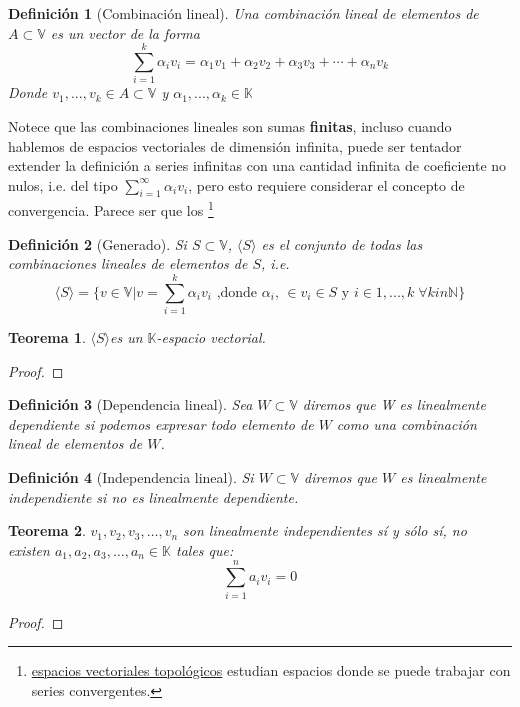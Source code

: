 \documentclass[14pt]{extarticle} %
\newtheorem{definicion}{Definición}
\newtheorem{teorema}{Teorema}
\theoremstyle{problemastyle} %
\newcommand{\kampo}{\mathbb{K}}
\newcommand{\evV}{\mathbb{V}} %
\newcommand{\bb}[1]{\mathbb{#1}}
\newcommand{\generado}[1]{\langle #1 \rangle}
\begin{document}
\begin{definicion}[Combinación lineal]
    Una combinación lineal de elementos de $A \subset \evV$ es un vector de la forma
    $$ \sum_{i=1}^k \alpha_i v_i = \alpha_1 v_1 + \alpha_2 v_2 + \alpha_3 v_3 + \dotsb + \alpha_n v_k$$
    Donde $v_1,...,v_k\in A \subset \evV$ y $\alpha_1,...,\alpha_k\in \kampo$
\end{definicion}
Notece que las combinaciones lineales son sumas \textbf{finitas}, incluso cuando hablemos de espacios vectoriales de dimensión infinita, puede ser tentador extender la definición a series infinitas con una cantidad infinita de coeficiente no nulos, i.e. del tipo $\sum_{i=1}^\infty \alpha_i v_i$, pero esto requiere considerar el concepto de convergencia. Parece ser que los 
\footnote{
\href{https://en.wikipedia.org/wiki/Topological_vector_space}{espacios vectoriales topológicos} estudian espacios donde se puede trabajar con series convergentes.
}

\begin{definicion}[Generado]
    Si $S \subset \evV $, $\generado{S}$ es el conjunto de todas las combinaciones lineales de elementos de $S$, i.e.
    $$ \generado{S}= \{ v \in \evV  | v = \sum_{i=1}^k \alpha_i v_i \text{ ,donde } \alpha_i \text{, } \in v_i \in S \text{ 
 y } i \in 1,..., k \; \forall k in \bb{N}\} $$
\end{definicion}

\begin{teorema}
\label{generado es e.v.}
    $\generado{S}$es un $\kampo$-espacio vectorial.
\end{teorema}
\begin{proof}
    \todo{}
\end{proof}
\begin{definicion}[Dependencia lineal]
    Sea  $W \subset \evV$ diremos que W es linealmente dependiente si podemos expresar todo elemento de $W$ como una combinación lineal de elementos de $W$.
\end{definicion}

\begin{definicion}[Independencia lineal]
    Si $W \subset \evV$ diremos que $W$ es linealmente independiente si no es linealmente dependiente.
\end{definicion}

\begin{teorema}
    $v_1,v_2,v_3,\ldots,v_n$ son linealmente independientes sí y sólo sí, no existen $a_1,a_2,a_3,\ldots,a_n \in \kampo$ tales que:
    $$ \sum_{i=1}^{n} a_i v_i = 0$$
\end{teorema}
\begin{proof}
    
\end{proof}
\end{document}
